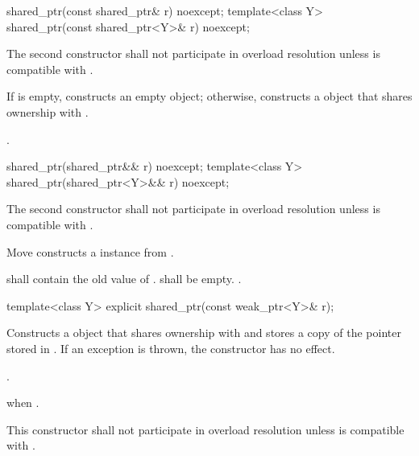 %
\begin{itemdecl}
shared_ptr(const shared_ptr& r) noexcept;
template<class Y> shared_ptr(const shared_ptr<Y>& r) noexcept;
\end{itemdecl}

\begin{itemdescr}
\pnum\remarks
The second constructor shall not participate in overload resolution unless
 is compatible with .

\pnum\effects  If  is empty, constructs
an empty  object; otherwise, constructs
a  object that shares ownership with .

\pnum\postconditions  {}.
\end{itemdescr}

%
\begin{itemdecl}
shared_ptr(shared_ptr&& r) noexcept;
template<class Y> shared_ptr(shared_ptr<Y>&& r) noexcept;
\end{itemdecl}

\begin{itemdescr}
\pnum
\remarks The second constructor shall not participate in overload resolution unless
 is compatible with .

\pnum
\effects Move constructs a  instance from .

\pnum
\postconditions {} shall contain the old value of
.  shall be empty. .
\end{itemdescr}

%
%
\begin{itemdecl}
template<class Y> explicit shared_ptr(const weak_ptr<Y>& r);
\end{itemdecl}

\begin{itemdescr}
\pnum\effects  Constructs a  object that shares ownership with
 and stores a copy of the pointer stored in .
If an exception is thrown, the constructor has no effect.

\pnum\postconditions  {}.

\pnum\throws  {} when .

\pnum\remarks This constructor shall not participate in overload resolution unless
 is compatible with .
\end{itemdescr}

